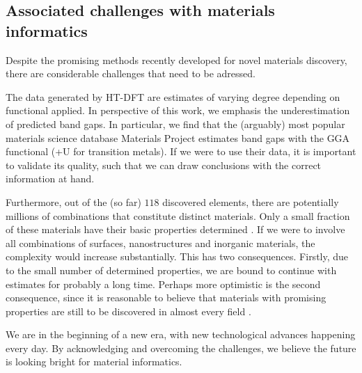 \subsection{Associated challenges with materials informatics}


Despite the promising methods recently developed for novel materials discovery, there are considerable challenges that need to be adressed.

The data generated by HT-DFT are estimates of varying degree depending on functional applied. In perspective of this work, we emphasis the underestimation of predicted band gaps. In particular, we find that the (arguably) most popular materials science database Materials Project estimates band gaps with the GGA functional (+U for transition metals). If we were to use their data, it is important to validate its quality, such that we can draw conclusions with the correct information at hand.

Furthermore, out of the (so far) $118$ discovered elements, there are potentially millions of combinations that constitute distinct materials. Only a small fraction of these materials have their basic properties determined \cite{Springer2017}. If we were to involve all combinations of surfaces, nanostructures and inorganic materials, the complexity would increase substantially. This has two consequences. Firstly, due to the small number of determined properties, we are bound to continue with estimates for probably a long time. Perhaps more optimistic is the second consequence, since it is reasonable to believe that materials with promising properties are still to be discovered in almost every field \cite{Pedregosa2012}.

We are in the beginning of a new era, with new technological advances happening every day. By acknowledging and overcoming the challenges, we believe the future is looking bright for material informatics.
